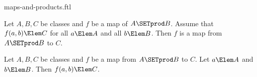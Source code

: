 \documentclass{stex}
\begin{document}
\begin{smodule}{maps-and-products.ftl}

\begin{proposition}[forthel]
  Let $A, B, C$ be classes and $f$ be a map of $A \SETprod B$.
  Assume that $f(a,b) \Elem C$ for all $a \Elem A$ and all $b \Elem B$.
  Then $f$ is a map from $A \SETprod B$ to $C$.
\end{proposition}

\begin{proposition}[forthel]
  Let $A, B, C$ be classes and $f$ be a map from $A \SETprod B$ to $C$.
  Let $a \Elem A$ and $b \Elem B$.
  Then $f(a,b) \Elem C$.
\end{proposition}
\end{smodule}
\end{document}
